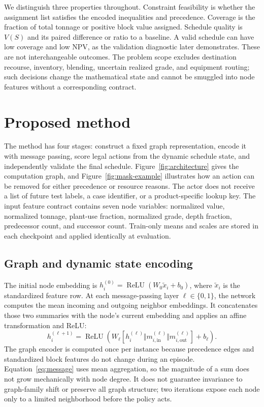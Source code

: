 \documentclass[11pt]{article}
\begin{document}
We distinguish three properties throughout. Constraint feasibility is whether the assignment list satisfies the encoded inequalities and precedence. Coverage is the fraction of total tonnage or positive block value assigned. Schedule quality is $V(S)$ and its paired difference or ratio to a baseline. A valid schedule can have low coverage and low NPV, as the validation diagnostic later demonstrates. These are not interchangeable outcomes. The problem scope excludes destination recourse, inventory, blending, uncertain realized grade, and equipment routing; such decisions change the mathematical state and cannot be smuggled into node features without a corresponding contract.

\section{Proposed method}
\label{sec:proposed-method}
The method has four stages: construct a fixed graph representation, encode it with message passing, score legal actions from the dynamic schedule state, and independently validate the final schedule. Figure~\ref{fig:architecture} gives the computation graph, and Figure~\ref{fig:mask-example} illustrates how an action can be removed for either precedence or resource reasons. The actor does not receive a list of future test labels, a case identifier, or a product-specific lookup key. The input feature contract contains seven node variables: normalized value, normalized tonnage, plant-use fraction, normalized grade, depth fraction, predecessor count, and successor count. Train-only means and scales are stored in each checkpoint and applied identically at evaluation.

\subsection{Graph and dynamic state encoding}
The initial node embedding is $h_i^{(0)}=\operatorname{ReLU}(W_0\tilde x_i+b_0)$, where $\tilde x_i$ is the standardized feature row. At each message-passing layer $\ell\in\{0,1\}$, the network computes the mean incoming and outgoing neighbor embeddings. It concatenates those two summaries with the node's current embedding and applies an affine transformation and ReLU:
\begin{equation}
h_i^{(\ell+1)}=\operatorname{ReLU}\left(W_\ell[h_i^{(\ell)}\Vert m_{i,\mathrm{in}}^{(\ell)}\Vert m_{i,\mathrm{out}}^{(\ell)}]+b_\ell\right).
\label{eq:message}
\end{equation}
The graph encoder is computed once per instance because precedence edges and standardized block features do not change during an episode. Equation~\ref{eq:message} uses mean aggregation, so the magnitude of a sum does not grow mechanically with node degree. It does not guarantee invariance to graph-family shift or preserve all graph structure; two iterations expose each node only to a limited neighborhood before the policy acts.
\end{document}
